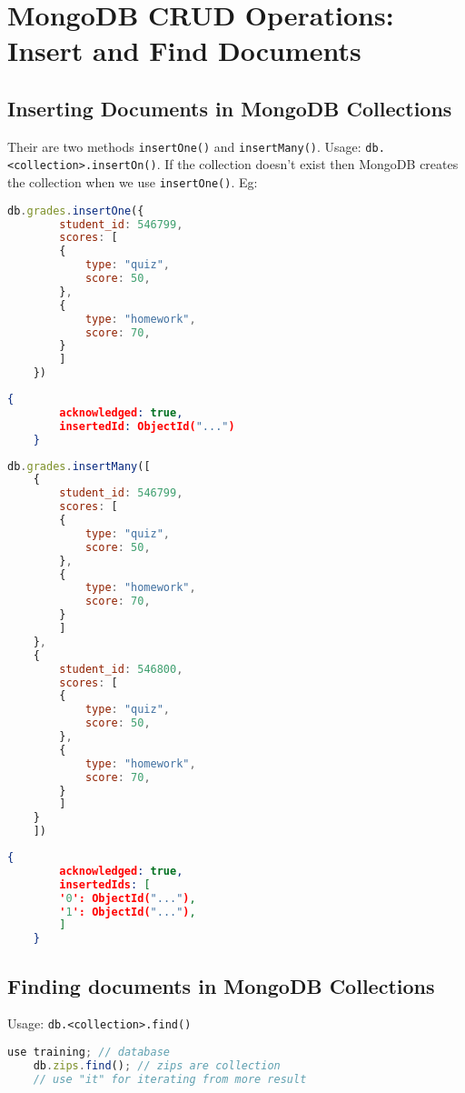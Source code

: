 \documentclass[../main.tex]{subfiles}
\begin{document}
\chapter{MongoDB \gls{CRUD} Operations: Insert and Find Documents}
\section{Inserting Documents in MongoDB Collections}
Their are two methods 
\lstinline {insertOne()} and \lstinline {insertMany()}.
\newline
Usage: \lstinline {db.<collection>.insertOn()}.
If the collection doesn't exist then MongoDB creates the collection when we use \lstinline{insertOne()}.
Eg: 
\begin{lstlisting}[caption=insertOne using mongosh, language=JavaScript]
	db.grades.insertOne({
		student_id: 546799, 
		scores: [
		{
			type: "quiz", 
			score: 50,
		},
		{
			type: "homework", 
			score: 70,
		}
		]
	})
\end{lstlisting}

\begin{lstlisting}[caption=output of insertOne using mongosh, language=JSON]
	{
		acknowledged: true,
		insertedId: ObjectId("...")
	}
\end{lstlisting}

\begin{lstlisting}[caption=insertMany using mongosh, language=JavaScript]
	db.grades.insertMany([
	{
		student_id: 546799, 
		scores: [
		{
			type: "quiz", 
			score: 50,
		},
		{
			type: "homework", 
			score: 70,
		}
		]
	},
	{
		student_id: 546800, 
		scores: [
		{
			type: "quiz", 
			score: 50,
		},
		{
			type: "homework", 
			score: 70,
		}
		]
	}
	])
\end{lstlisting}
\begin{lstlisting}[caption=output of insertMany using mongosh, language=JSON]
	{
		acknowledged: true,
		insertedIds: [
		'0': ObjectId("..."),
		'1': ObjectId("..."),
		]
	}
\end{lstlisting}

\section{Finding documents in MongoDB Collections}
Usage: \lstinline{db.<collection>.find()}
\begin{lstlisting}[caption=find method in mongosh, language=JavaScript]
	use training; // database 
	db.zips.find(); // zips are collection 
	// use "it" for iterating from more result
\end{lstlisting}
\end{document}
